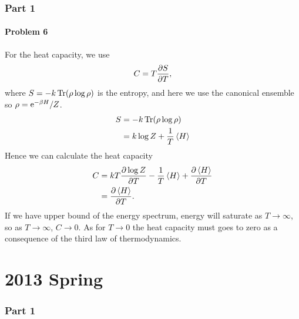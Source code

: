 \documentclass[10pt]{article}
\begin{document}
\section{Part 1}
\subsection{Problem 6}
For the heat capacity, we use 
\begin{equation}
	C = T \pdv{S}{T},
\end{equation}
where $S = - k \Tr(\rho \log \rho)$ is the entropy, and here we use the canonical ensemble so $\rho = {\mathrm{e}}^{-\beta H} / Z$.
\begin{align*}
	S &= - k \Tr(\rho \log \rho) \\
	  &= k \log Z + \frac{1}{T} \ev{H} 
\end{align*}
Hence we can calculate the heat capacity 
\begin{align}
	C &= k T \pdv{\log Z}{T} - \frac{1}{T} \ev{H} + \pdv{\ev{H}}{T} \\
	  &= \pdv{\ev{H}}{T}.
\end{align}
If we have upper bound of the energy spectrum, energy will saturate as $T \to \infty$, so as $T \to \infty$, $C \to 0$. As for $T \to 0$ the heat capacity must goes to zero as a consequence of the third law of thermodynamics.
\newpage
\part{2013 Spring}
\section{Part 1}
\end{document}
